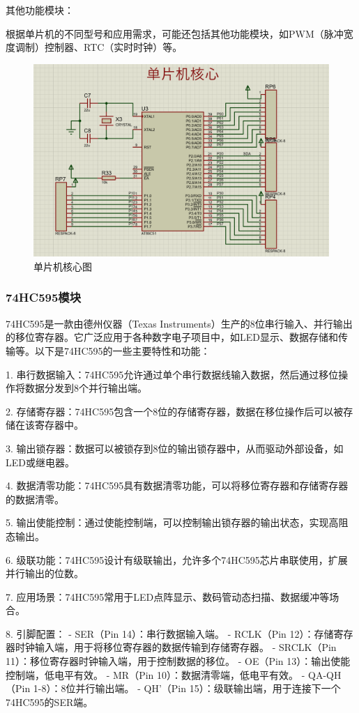 \documentclass{textreportclass}  %
\begin{document}
		其他功能模块：
		
		根据单片机的不同型号和应用需求，可能还包括其他功能模块，如PWM（脉冲宽度调制）控制器、RTC（实时时钟）等。
		\begin{figure}[htbp]
		\centering
		\includegraphics[scale=0.4]{Fig/单片机核心.png}
		\caption{单片机核心图}\label{Fig.6}
		\end{figure}


		\subsubsection{74HC595模块}				%
		74HC595是一款由德州仪器（Texas Instruments）生产的8位串行输入、并行输出的移位寄存器。它广泛应用于各种数字电子项目中，如LED显示、数据存储和传输等。以下是74HC595的一些主要特性和功能：
		
		1. 串行数据输入：74HC595允许通过单个串行数据线输入数据，然后通过移位操作将数据分发到8个并行输出端。
		
		2. 存储寄存器：74HC595包含一个8位的存储寄存器，数据在移位操作后可以被存储在该寄存器中。
		
		3. 输出锁存器：数据可以被锁存到8位的输出锁存器中，从而驱动外部设备，如LED或继电器。
		
		4. 数据清零功能：74HC595具有数据清零功能，可以将移位寄存器和存储寄存器的数据清零。
		
		5. 输出使能控制：通过使能控制端，可以控制输出锁存器的输出状态，实现高阻态输出。
		
		6. 级联功能：74HC595设计有级联输出，允许多个74HC595芯片串联使用，扩展并行输出的位数。
		
		7. 应用场景：74HC595常用于LED点阵显示、数码管动态扫描、数据缓冲等场合。
		
		8. 引脚配置：
		- SER（Pin 14）：串行数据输入端。
		- RCLK（Pin 12）：存储寄存器时钟输入端，用于将移位寄存器的数据传输到存储寄存器。
		- SRCLK（Pin 11）：移位寄存器时钟输入端，用于控制数据的移位。
		- OE（Pin 13）：输出使能控制端，低电平有效。
		- MR（Pin 10）：数据清零端，低电平有效。
		- QA-QH（Pin 1-8）：8位并行输出端。
		- QH'（Pin 15）：级联输出端，用于连接下一个74HC595的SER端。
		
\end{document}
